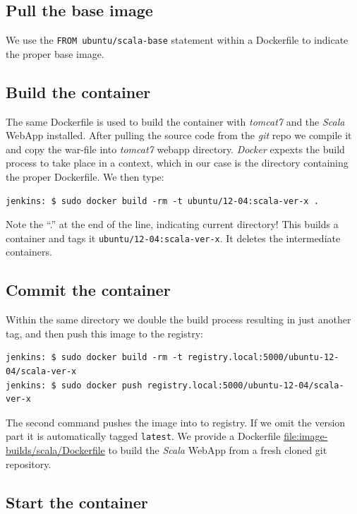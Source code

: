 \documentclass[captions=tableheading]{article}
\begin{document}
\subsection{Pull the base image}
\label{sec-6-1}

We use the \texttt{FROM ubuntu/scala-base} statement within a  Dockerfile to indicate the proper base image.
\subsection{Build the container}
\label{sec-6-2}

The same Dockerfile is used to build the container with \emph{tomcat7} and the \emph{Scala} WebApp installed. After pulling the source code from the \emph{git} repo we compile it and copy the war-file into \emph{tomcat7} webapp directory. \emph{Docker} expexts the build process to take place in a context, which in our case is the directory containing the proper Dockerfile. We then type:

\begin{verbatim}
jenkins: $ sudo docker build -rm -t ubuntu/12-04:scala-ver-x .
\end{verbatim}
Note the ``.'' at the end of the line, indicating current directory! This builds a container and tags it \texttt{ubuntu/12-04:scala-ver-x}. It deletes the intermediate containers.
\subsection{Commit the container}
\label{sec-6-3}

Within the same directory we double the build process resulting in just another tag, and then push this image to the registry:

\begin{verbatim}
jenkins: $ sudo docker build -rm -t registry.local:5000/ubuntu-12-04/scala-ver-x
jenkins: $ sudo docker push registry.local:5000/ubuntu-12-04/scala-ver-x
\end{verbatim}
The second command pushes the image into to registry. If we omit the version part it is automatically tagged \texttt{latest}.
We provide a Dockerfile  \hyperref[Dockerfile]{file:image-builds/scala/Dockerfile}  to build the \emph{Scala} WebApp from a fresh cloned git repository.   
\subsection{Start the container}
\label{sec-6-4}
\end{document}
